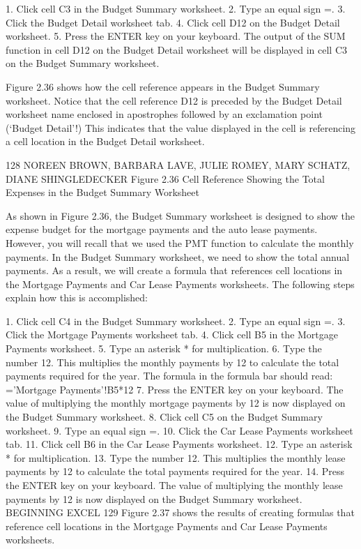 1.   Click cell C3 in the Budget Summary worksheet.
2.   Type an equal sign =.
3.   Click the Budget Detail worksheet tab.
4.   Click cell D12 on the Budget Detail worksheet.
5.   Press the ENTER key on your keyboard. The output of the SUM function in cell D12 on
the Budget Detail worksheet will be displayed in cell C3 on the Budget Summary worksheet.

Figure 2.36 shows how the cell reference appears in the Budget Summary worksheet. Notice that
the cell reference D12 is preceded by the Budget Detail worksheet name enclosed in apostrophes
followed by an exclamation point (‘Budget Detail’!) This indicates that the value displayed in the cell
is referencing a cell location in the Budget Detail worksheet.




128 NOREEN BROWN, BARBARA LAVE, JULIE ROMEY, MARY SCHATZ, DIANE SHINGLEDECKER
Figure 2.36 Cell Reference Showing the Total Expenses in the Budget Summary Worksheet


As shown in Figure 2.36, the Budget Summary worksheet is designed to show the expense budget
for the mortgage payments and the auto lease payments. However, you will recall that we used the
PMT function to calculate the monthly payments. In the Budget Summary worksheet, we need to
show the total annual payments. As a result, we will create a formula that references cell locations in
the Mortgage Payments and Car Lease Payments worksheets. The following steps explain how this
is accomplished:

1.   Click cell C4 in the Budget Summary worksheet.
2.   Type an equal sign =.
3.   Click the Mortgage Payments worksheet tab.
4.   Click cell B5 in the Mortgage Payments worksheet.
5.   Type an asterisk * for multiplication.
6.   Type the number 12. This multiplies the monthly payments by 12 to calculate the total payments
required for the year. The formula in the formula bar should read: =’Mortgage Payments’!B5*12
7.   Press the ENTER key on your keyboard. The value of multiplying the monthly mortgage
payments by 12 is now displayed on the Budget Summary worksheet.
8.   Click cell C5 on the Budget Summary worksheet.
9.   Type an equal sign =.
10.   Click the Car Lease Payments worksheet tab.
11.   Click cell B6 in the Car Lease Payments worksheet.
12.   Type an asterisk * for multiplication.
13.   Type the number 12. This multiplies the monthly lease payments by 12 to calculate the total
payments required for the year.
14.   Press the ENTER key on your keyboard. The value of multiplying the monthly lease payments
by 12 is now displayed on the Budget Summary worksheet.
BEGINNING EXCEL 129
Figure 2.37 shows the results of creating formulas that reference cell locations in the Mortgage
Payments and Car Lease Payments worksheets.




